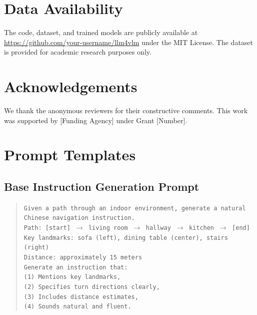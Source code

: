 \documentclass[11pt,a4paper]{article}
\begin{document}
\section*{Data Availability}

The code, dataset, and trained models are publicly available at \url{https://github.com/your-username/llm4vlm} under the MIT License. The dataset is provided for academic research purposes only.

\section*{Acknowledgements}


We thank the anonymous reviewers for their constructive comments. This work was supported by [Funding Agency] under Grant [Number].




\appendix

\section{Prompt Templates}

\subsection{Base Instruction Generation Prompt}

\begin{quote}
\small
\texttt{Given a path through an indoor environment, generate a natural Chinese navigation instruction.\\[1mm]
Path: [start] $\rightarrow$ living room $\rightarrow$ hallway $\rightarrow$ kitchen $\rightarrow$ [end]\\
Key landmarks: sofa (left), dining table (center), stairs (right)\\
Distance: approximately 15 meters\\[1mm]
Generate an instruction that:\\
(1) Mentions key landmarks,\\
(2) Specifies turn directions clearly,\\
(3) Includes distance estimates,\\
(4) Sounds natural and fluent.}
\end{quote}
\end{document}
